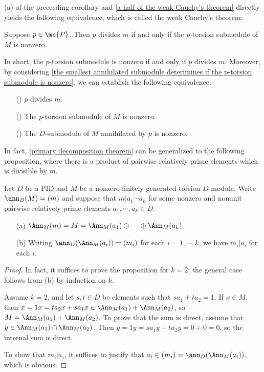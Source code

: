 \begin{rmk}
    (a) of the preceeding corollary and \cref{a half of the weak Cauchy's theorem} directly yields the following equivalence, which is called the weak Cauchy's theorem:
    \begin{center}
        Suppose $p\in\mc{P}$.
        Then $p$ divides $m$ if and only if the $p$-torsion submodule of $M$ is nonzero.
    \end{center}
    In short, the $p$-torsion submodule is nonzero if and only if $p$ divides $m$.
    Moreover, by considering \cref{the smallest annihilated submodule deterimines if the p-torsion submodule is nonzero}, we can establish the following equivalence:
    \begin{enumerate}
        \item[(\romannumeral 1)]
        {
            $p$ divides $m$.
        }
        \item[(\romannumeral 2)]
        {
            The $p$-torsion submodule of $M$ is nonzero.
        }
        \item[(\romannumeral 3)]
        {
            The $D$-submodule of $M$ annihilated by $p$ is nonzero.
        }
    \end{enumerate}
\end{rmk}

In fact, \cref{primary decomposition theorem} can be generalized to the following proposition, where there is a product of pairwise relatively prime elements which is divisible by $m$.
\begin{prop}
    Let $D$ be a PID and $M$ be a nonzero finitely generated torsion $D$-module.
    Write $\ann_D(M)=(m)$ and suppose that $m|a_1\cdots a_k$ for some nonzero and nonunit pairwise relatively prime elements $a_1, \cdots, a_k\in D$.
    \begin{enumerate}
        \item[(a)]
        {
            $\Ann_M(m)=M=\Ann_M(a_1)\oplus\cdots\oplus\Ann_M(a_k)$.
        }
        \item[(b)]
        {
            Writing $\ann_D(\Ann_M(a_i))=(m_i)$ for each $i=1, \cdots, k$, we have $m_i|a_i$ for each $i$.
        }
    \end{enumerate}
\end{prop}
\begin{proof}
    In fact, it suffices to prove the proposition for $k=2$; the general case follows from (b) by induction on $k$.
    
    Assume $k=2$, and let $s, t\in D$ be elements such that $sa_1+ta_2=1$.
    If $x\in M$, then $x=1x=ta_2x+sa_1x\in\Ann_M(a_1)+\Ann_M(a_2)$, so $M=\Ann_M(a_1)+\Ann_M(a_2)$.
    To prove that the sum is direct, assume that $y\in\Ann_M(a_1)\cap\Ann_M(a_2)$.
    Then $y=1y=sa_1y+ta_2y=0+0=0$, so the internal sum is direct.

    To show that $m_i|a_i$, it suffices to justify that $a_i\in (m_i)=\ann_D(\Ann_M(a_i))$, which is obvious.
\end{proof}